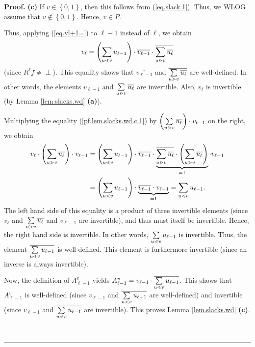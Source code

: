 \documentclass[numbers=enddot,12pt,final,onecolumn,notitlepage]{scrartcl}%
\theoremstyle{definition}
\newenvironment{verlong}{}{}
\newcommand{\undf}{\operatorname*{\bot}}
\newcommand{\downslack}{A}
\newenvironment{proof}[1][Proof]{\noindent\textbf{#1.} }{\ \rule{0.5em}{0.5em}}
\let\sumnonlimits\sum
\renewcommand{\sum}{\sumnonlimits\limits}
\begin{document}
\begin{verlong}
\begin{proof}
\textbf{(c)} If $v\in\left\{  0,1\right\}  $, then this follows from
(\ref{eq.slack.1}). Thus, we WLOG assume that $v\notin\left\{  0,1\right\}  $.
Hence, $v\in P$.

Thus, applying (\ref{eq.vl+1=}) to $\ell-1$ instead of $\ell$, we obtain%
\begin{equation}
v_{\ell}=\left(  \sum\limits_{u\lessdot v}u_{\ell-1}\right)  \cdot
\overline{v_{\ell-1}}\cdot\overline{\sum\limits_{u\gtrdot v}\overline{u_{\ell
}}} \label{pf.lem.slacks.wd.c.1}%
\end{equation}
(since $R^{\ell}f \neq\undf$). This equality shows that $\overline{v_{\ell-1}%
}$ and $\overline{\sum\limits_{u\gtrdot v}\overline{u_{\ell}}}$ are
well-defined. In other words, the elements $v_{\ell-1}$ and $\sum
\limits_{u\gtrdot v}\overline{u_{\ell}}$ are invertible. Also, $v_{\ell}$ is
invertible (by Lemma \ref{lem.slacks.wd} \textbf{(a)}).

Multiplying the equality (\ref{pf.lem.slacks.wd.c.1}) by $\left(
\sum\limits_{u\gtrdot v}\overline{u_{\ell}}\right)  \cdot v_{\ell-1}$ on the
right, we obtain%
\begin{align*}
v_{\ell}\cdot\left(  \sum\limits_{u\gtrdot v}\overline{u_{\ell}}\right)  \cdot
v_{\ell-1}  &  =\left(  \sum\limits_{u\lessdot v}u_{\ell-1}\right)
\cdot\overline{v_{\ell-1}}\cdot\underbrace{\overline{\sum\limits_{u\gtrdot
v}\overline{u_{\ell}}}\cdot\left(  \sum\limits_{u\gtrdot v}\overline{u_{\ell}%
}\right)  }_{=1}\cdot v_{\ell-1}\\
&  =\left(  \sum\limits_{u\lessdot v}u_{\ell-1}\right)  \cdot
\underbrace{\overline{v_{\ell-1}}\cdot v_{\ell-1}}_{=1}=\sum\limits_{u\lessdot
v}u_{\ell-1}.
\end{align*}
The left hand side of this equality is a product of three invertible elements
(since $v_{\ell}$ and $\sum\limits_{u\gtrdot v}\overline{u_{\ell}}$ and
$v_{\ell-1}$ are invertible), and thus must itself be invertible. Hence, the
right hand side is invertible. In other words, $\sum\limits_{u\lessdot
v}u_{\ell-1}$ is invertible. Thus, the element $\overline{\sum
\limits_{u\lessdot v}u_{\ell-1}}$ is well-defined. This element is furthermore
invertible (since an inverse is always invertible).

Now, the definition of $\downslack_{\ell-1}^{v}$ yields $\downslack_{\ell
-1}^{v}=v_{\ell-1}\cdot\overline{\sum\limits_{u\lessdot v}u_{\ell-1}}$. This
shows that $\downslack_{\ell-1}^{v}$ is well-defined (since $v_{\ell-1}$ and
$\overline{\sum\limits_{u\lessdot v}u_{\ell-1}}$ are well-defined) and
invertible (since $v_{\ell-1}$ and $\overline{\sum\limits_{u\lessdot v}%
u_{\ell-1}}$ are invertible). This proves Lemma \ref{lem.slacks.wd}
\textbf{(c)}. \medskip


\end{proof}
\end{verlong}
\end{document}
